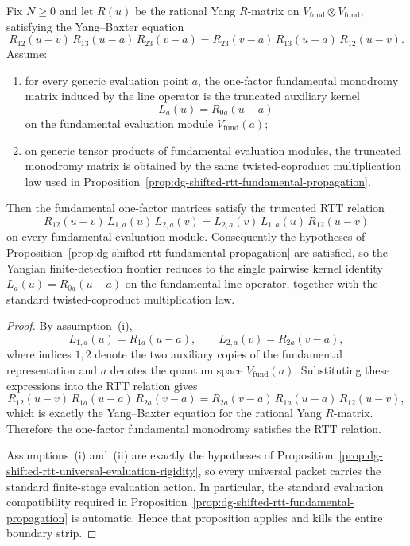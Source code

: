 \begin{proposition}
\label{prop:dg-shifted-rtt-auxiliary-kernel-criterion}
Fix $N \ge 0$ and let $R(u)$ be the rational Yang $R$-matrix on
$V_{\mathrm{fund}}\otimes V_{\mathrm{fund}}$, satisfying the
Yang--Baxter equation
\[
R_{12}(u-v)\,R_{13}(u-a)\,R_{23}(v-a)
=
R_{23}(v-a)\,R_{13}(u-a)\,R_{12}(u-v).
\]
Assume:
\begin{enumerate}[label=\textup{(\roman*)}]
\item for every generic evaluation point $a$, the one-factor
  fundamental monodromy matrix induced by the line operator is the
  truncated auxiliary kernel
  \[
  L_a(u)=R_{0a}(u-a)
  \]
  on the fundamental evaluation module
  $V_{\mathrm{fund}}(a)$;
\item on generic tensor products of fundamental evaluation modules, the
  truncated monodromy matrix is obtained by the same twisted-coproduct
  multiplication law used in
  Proposition~\ref{prop:dg-shifted-rtt-fundamental-propagation}.
\end{enumerate}
Then the fundamental one-factor matrices satisfy the truncated RTT
relation
\[
R_{12}(u-v)\,L_{1,a}(u)\,L_{2,a}(v)
=
L_{2,a}(v)\,L_{1,a}(u)\,R_{12}(u-v)
\]
on every fundamental evaluation module.  Consequently the hypotheses of
Proposition~\ref{prop:dg-shifted-rtt-fundamental-propagation} are
satisfied, so the Yangian finite-detection frontier reduces to the
single pairwise kernel identity
$L_a(u)=R_{0a}(u-a)$ on the fundamental line operator, together with
the standard twisted-coproduct multiplication law.
\end{proposition}

\begin{proof}
By assumption~\textup{(i)},
\[
L_{1,a}(u)=R_{1a}(u-a),
\qquad
L_{2,a}(v)=R_{2a}(v-a),
\]
where indices $1,2$ denote the two auxiliary copies of the fundamental
representation and $a$ denotes the quantum space
$V_{\mathrm{fund}}(a)$.  Substituting these expressions into the RTT
relation gives
\[
R_{12}(u-v)\,R_{1a}(u-a)\,R_{2a}(v-a)
=
R_{2a}(v-a)\,R_{1a}(u-a)\,R_{12}(u-v),
\]
which is exactly the Yang--Baxter equation for the rational Yang
$R$-matrix.  Therefore the one-factor fundamental monodromy satisfies
the RTT relation.

Assumptions~\textup{(i)} and~\textup{(ii)} are exactly the hypotheses of
Proposition~\ref{prop:dg-shifted-rtt-universal-evaluation-rigidity}, so
every universal packet carries the standard finite-stage evaluation
action.  In particular, the standard evaluation compatibility required
in Proposition~\ref{prop:dg-shifted-rtt-fundamental-propagation} is
automatic.  Hence that proposition applies and kills the entire
boundary strip.
\end{proof}

